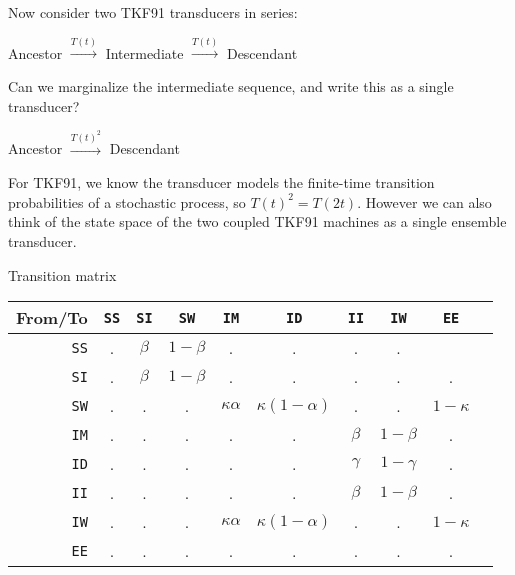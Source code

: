 \documentclass{beamer}
\begin{document}
\begin{frame}{}

Now consider two TKF91 transducers in series:

\vspace{\baselineskip}

\centerline{Ancestor
 $\stackrel{T(t)}{\longrightarrow}$ Intermediate
 $\stackrel{T(t)}{\longrightarrow}$ Descendant}

\vspace{\baselineskip}

Can we marginalize the intermediate sequence, and write this as a single transducer?

\vspace{\baselineskip}

\centerline{Ancestor
 $\stackrel{T(t)^2}{\longrightarrow}$ Descendant}

\vspace{\baselineskip}
For TKF91, we know the transducer models the finite-time
transition probabilities of a stochastic process,
so $T(t)^2 = T(2t)$.
However we can also think of the state space of the two coupled TKF91 machines
as a single ensemble transducer.

\end{frame}

\begin{frame}{}
Transition matrix
\begin{tabular}{r|ccccccccc}
From/To & {\tt SS} & {\tt SI} & {\tt SW} & {\tt IM} & {\tt ID} & {\tt II} & {\tt IW} & {\tt EE} \\
\hline
{\tt SS} & . & $\beta$ & $1-\beta$ & . & . & . & . \\
{\tt SI} & . & $\beta$ & $1-\beta$ & . & . & . & . & . \\
{\tt SW} & . & . & . & $\kappa\alpha$ & $\kappa(1-\alpha)$ & . & . & $1-\kappa$ \\
{\tt IM} & . & . & . & . & . & $\beta$ & $1-\beta$ & . \\
{\tt ID} & . & . & . & . & . & $\gamma$ & $1-\gamma$ & . \\
{\tt II} & . & . & . & . & . & $\beta$ & $1-\beta$ & . \\
{\tt IW} & . & . & . & $\kappa\alpha$ & $\kappa(1-\alpha)$ & . & . & $1-\kappa$ \\
{\tt EE} & . & . & . & . & . & . & . & .
\end{tabular}
\end{frame}
\end{document}

